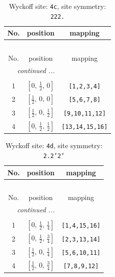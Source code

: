 \documentclass[fleqn,8pt]{jsarticle}
\begin{document}
\renewcommand{\arraystretch}{1.2}
\begin{longtable}{ccc}
\caption{Wyckoff site: {\tt 4c}, site symmetry: {\tt 222.}}
 \\
 \hline \hline
No. & position & mapping \\ \hline \endfirsthead

\multicolumn{2}{l}{\tablename\ \thetable{}} \\
 \hline \hline
No. & position & mapping \\ \hline \endhead

 \hline \hline
\multicolumn{2}{r}{\footnotesize\it continued ...} \\ \endfoot

 \hline \hline
\multicolumn{2}{r}{} \\ \endlastfoot

1 & $\left[ 0,\, \frac{1}{2},\, 0 \right]$ & {\tt [1,2,3,4]} \\ \hline
2 & $\left[ \frac{1}{2},\, 0,\, 0 \right]$ & {\tt [5,6,7,8]} \\ \hline
3 & $\left[ \frac{1}{2},\, 0,\, \frac{1}{2} \right]$ & {\tt [9,10,11,12]} \\ \hline
4 & $\left[ 0,\, \frac{1}{2},\, \frac{1}{2} \right]$ & {\tt [13,14,15,16]} \\
\end{longtable}
\renewcommand{\arraystretch}{1.2}
\begin{longtable}{ccc}
\caption{Wyckoff site: {\tt 4d}, site symmetry: {\tt 2.2'2'}}
 \\
 \hline \hline
No. & position & mapping \\ \hline \endfirsthead

\multicolumn{2}{l}{\tablename\ \thetable{}} \\
 \hline \hline
No. & position & mapping \\ \hline \endhead

 \hline \hline
\multicolumn{2}{r}{\footnotesize\it continued ...} \\ \endfoot

 \hline \hline
\multicolumn{2}{r}{} \\ \endlastfoot

1 & $\left[ 0,\, \frac{1}{2},\, \frac{1}{4} \right]$ & {\tt [1,4,15,16]} \\ \hline
2 & $\left[ 0,\, \frac{1}{2},\, \frac{3}{4} \right]$ & {\tt [2,3,13,14]} \\ \hline
3 & $\left[ \frac{1}{2},\, 0,\, \frac{1}{4} \right]$ & {\tt [5,6,10,11]} \\ \hline
4 & $\left[ \frac{1}{2},\, 0,\, \frac{3}{4} \right]$ & {\tt [7,8,9,12]} \\
\end{longtable}
\end{document}
